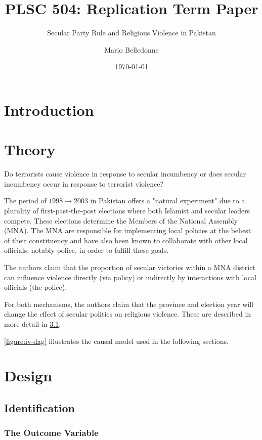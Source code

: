 \documentclass{scrartcl}
\title{PLSC 504: Replication Term Paper}
\subtitle{Secular Party Rule and Religious Violence in Pakistan}
\author{Mario Belledonne}
\date{\today}
\begin{document}
\maketitle

\section{Introduction}


\section{Theory}

Do terrorists cause violence in response to secular incumbency or does secular incumbency occur in response to terrorist violence?

The period of $1998 \rightarrow 2003$ in Pakistan offers a "natural experiment" due to a plurality of first-past-the-post elections where both Islamist and secular leaders compete. 
These elections determine the Members of the National Assembly (MNA). The MNA are responsible for implementing local policies at the behest of their constituency and have also been known to collaborate with other local officials, notably police, in order to fulfill these goals. 

The authors claim that the proportion of secular victories within a MNA district can influence violence directly (via policy) or indirectly by interactions with local officials (the police). 

For both mechanisms, the authors claim that the province and election year will change the effect of secular politics on religious violence. These are described in more detail in \ref{identification}.

\ref{figure:iv-dag} illustrates the causal model used in the following sections.

\section{Design}

\subsection{Identification} \label{identification}

\subsubsection{The Outcome Variable}
\end{document}
